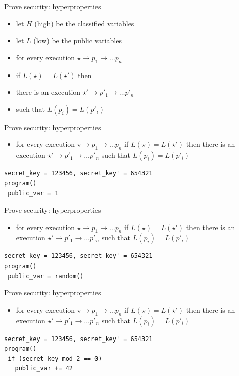 \documentclass{beamer}
\begin{document}
\begin{frame}{Prove security: hyperproperties}
  \begin{itemize}
  \item let $H$ (high) be the classified variables
  \item let $L$ (low) be the public variables
  \item for every execution $\star \rightarrow p_1 \rightarrow \dots p_n$
  \item if $L(\star) = L(\star')$ then
  \item there is an execution  $\star' \rightarrow p'_1 \rightarrow \dots p'_n$
  \item such that $L(p_i) = L(p'_i)$
  \end{itemize}
\end{frame}

\begin{frame}[fragile]{Prove security: hyperproperties}
  \begin{itemize}
  \item for every execution $\star \rightarrow p_1 \rightarrow \dots p_n$
    if $L(\star) = L(\star')$  then there is an execution
    $\star' \rightarrow p'_1 \rightarrow \dots p'_n$
  such that $L(p_i) = L(p'_i)$
  \end{itemize}
  \begin{verbatim}
secret_key = 123456, secret_key' = 654321
program()
 public_var = 1
  \end{verbatim}
\end{frame}

\begin{frame}[fragile]{Prove security: hyperproperties}
  \begin{itemize}
  \item for every execution $\star \rightarrow p_1 \rightarrow \dots p_n$
    if $L(\star) = L(\star')$  then there is an execution
    $\star' \rightarrow p'_1 \rightarrow \dots p'_n$
  such that $L(p_i) = L(p'_i)$
  \end{itemize}
  \begin{verbatim}
secret_key = 123456, secret_key' = 654321
program()
 public_var = random()
  \end{verbatim}
\end{frame}

\begin{frame}[fragile]{Prove security: hyperproperties}
  \begin{itemize}
  \item for every execution $\star \rightarrow p_1 \rightarrow \dots p_n$
    if $L(\star) = L(\star')$  then there is an execution
    $\star' \rightarrow p'_1 \rightarrow \dots p'_n$
  such that $L(p_i) = L(p'_i)$
  \end{itemize}
  \begin{verbatim}
secret_key = 123456, secret_key' = 654321
program()
 if (secret_key mod 2 == 0)
   public_var += 42
  \end{verbatim}
\end{frame}
\end{document}
